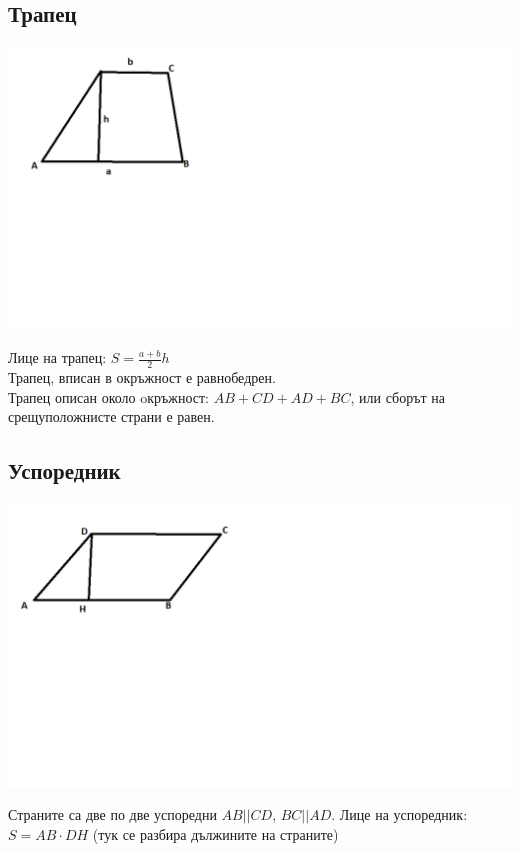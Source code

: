\documentclass{article}
\begin{document}
\vspace{-6cm}

\subsection{Трапец}

	
\includegraphics{Trapezoid}
\vspace{-8cm}

Лице на трапец: $S = \frac{a+b}{2}h$\\
Трапец, вписан в окръжност е равнобедрен.\\
Трапец описан около oкръжност: $AB + CD + AD + BC $, или сборът
на срещуположнисте страни е равен.


\subsection{Успоредник}


\includegraphics{Parallelogram}
\vspace{-6cm}

Страните са две по две успоредни $AB || CD$, $BC||AD $. 
Лице на успоредник: $S = AB \cdot DH$ (тук се разбира дължините на страните)
\end{document}
